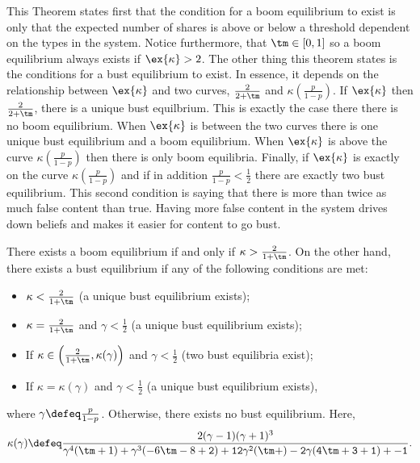This Theorem states first that the condition for a boom equilibrium to exist is only that the expected number of shares is above or below a threshold dependent on the types in the system. Notice furthermore, that $\tm \in [0,1]$ so a boom equilibrium always exists if $\ex{\kappa} > 2$. The other thing this theorem states is the conditions for a bust equilibrium to exist. In essence, it depends on the relationship between $\ex{\kappa}$ and two curves, $\frac{2}{2+\tm}$ and $\kappa(\frac{p}{1-p})$. If $\ex{\kappa} $ then $\frac{2}{2+\tm}$, there is a unique bust equilbrium. This is exactly the case there there is no boom equilibrium. When $\ex{\kappa}$ is between the two curves there is one unique bust equilibrium and a boom equilibrium. When $\ex{\kappa}$ is above the curve $\kappa(\frac{p}{1-p})$ then there is only boom equilibria. Finally, if $\ex{\kappa}$ is exactly  on the curve $\kappa(\frac{p}{1-p})$ and if in addition $\frac{p}{1-p} < \frac{1}{2}$ there are exactly two bust equilibrium. This second condition is saying that there is more than twice as much false content than true. Having more false content in the system drives down beliefs and makes it easier for content to go bust. 
\begin{theorem}\label{thm:equilibria-existence}
    There exists a  boom equilibrium if and only if $\kappa >  \frac{2}{1+\tm}$. On the other hand, there exists a bust equilibrium if any of the following conditions are met: 
    \begin{itemize}
        \item $\kappa < \frac{2}{1+\tm}$ (a unique bust equilibrium exists); 
        \item $\kappa = \frac{2}{1+\tm}$ and $\gamma < \frac{1}{2}$ (a unique bust equilibrium exists);  
        \item If $\kappa \in \left(\frac{2}{1+\tm} , \kappa(\gamma) \right)$ and $\gamma < \frac{1}{2}$ (two bust equilibria exist);
        \item If $\kappa = \kappa(\gamma)$ and $\gamma < \frac{1}{2}$ (a unique bust equilibrium exists),
    \end{itemize}
    where $\gamma \defeq \frac{p}{1-p}$. Otherwise, there exists no bust equilibrium. Here, \[\kappa(\gamma) \defeq \frac{2 (\gamma-1) (\gamma+1)^3}{\gamma^4 (\tm+1)+\gamma^3 (-6 \tm-8 \tt+2)+12 \gamma^2 (\tm+\tt)-2 \gamma (4 \tm+3 \tt+1)+\tt-1}.\]
\end{theorem}


